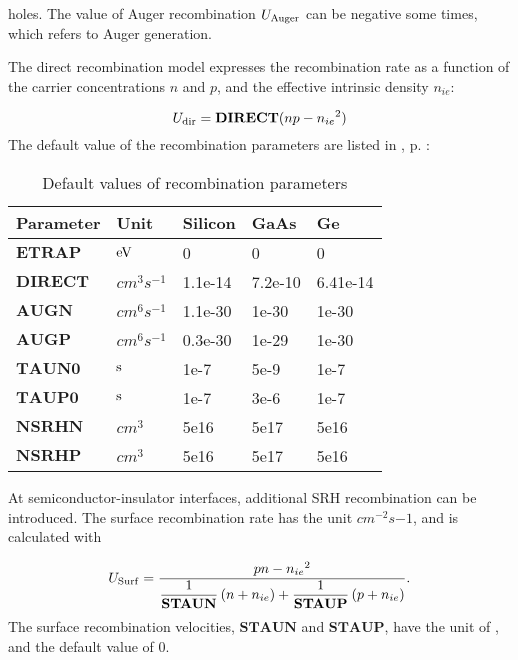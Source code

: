 \documentclass[oneside,12pt]{cgd_book}
\begin{document}
      holes. The value of Auger recombination $U_{\rm Auger}$ can be negative some times,
      which refers to Auger generation.
\par
{}The direct recombination
model expresses the recombination rate as a function of the carrier concentrations
$n$ and $p$, and the effective intrinsic density $n_{ie}$:
\par
\par
\begin{equation}
U_{\rm dir}={\bf DIRECT}(np-{n_{ie}}^2)
\end{equation}
The default value of the recombination parameters are listed in
, p. \pageref{tab:Equation:Recomb:Param}:
\par
\begin{longtable}{lllll}
\caption{\label{tab:Equation:Recomb:Param}Default values of recombination parameters} \\
\hline
 Parameter
& Unit
& Silicon
& GaAs
& Ge\\
\hline
$\mathbf{ETRAP}$
& $\text{eV}$
& 0
& 0
& 0
\\
 $\mathbf{DIRECT}$
& $cm^3s^{-1}$
& 1.1e-14
& 7.2e-10
& 6.41e-14
\\
 $\mathbf{AUGN}$
& $cm^6s^{-1}$
& 1.1e-30
& 1e-30
& 1e-30
\\
 $\mathbf{AUGP}$
& $cm^6s^{-1}$
& 0.3e-30
& 1e-29
& 1e-30
\\
 $\mathbf{TAUN0}$
& $\text{s}$
& 1e-7
& 5e-9
& 1e-7
\\
 $\mathbf{TAUP0}$
& $\text{s}$
& 1e-7
& 3e-6
& 1e-7
\\
 $\mathbf{NSRHN}$
& $cm^3$
& 5e16
& 5e17
& 5e16
\\
 $\mathbf{NSRHP}$
& $cm^3$
& 5e16
& 5e17
& 5e16\\
\end{longtable}
At semiconductor-insulator interfaces, additional SRH recombination can be introduced. The surface
        recombination rate has the unit $cm^{-2}s{-1}$, and is calculated
        with
\par
\par
\begin{equation}
U_{\rm Surf}=\dfrac{pn-{n_{ie}}^2}{\dfrac{1}{\bf STAUN}\left(n+n_{ie}\right)+\dfrac{1}{\bf
        STAUP}\left(p+n_{ie}\right)}.
\end{equation}
The surface recombination velocities, $\mathbf{STAUN}$ and $\mathbf{STAUP}$, have
      the unit of \cMeter\Per\Second, and the default value of 0.
\par
\end{document}
